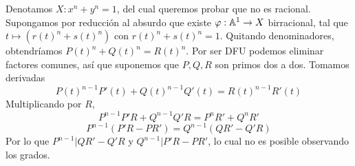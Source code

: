 \documentclass[twoside]{article}
\begin{document}
\begin{ejercicio}{4}
\end{ejercicio}
\begin{solucion}
Denotamos $X: x^n+y^n=1$, del cual queremos probar que no es racional. Supongamos por reducción al absurdo que existe $\varphi:\mathbb{A}^1\to X$ birracional, tal que $t\mapsto (r(t)^n+s(t)^n)$ con $r(t)^n+s(t)^n=1$.  Quitando denominadores, obtendríamos $P(t)^n+Q(t)^n=R(t)^n$. Por ser DFU podemos eliminar factores comunes, así que suponemos que $P,Q,R$ son primos dos a dos. Tomamos derivadas
$$P(t)^{n-1}P'(t)+Q(t)^{n-1}Q'(t)=R(t)^{n-1}R'(t)$$
Multiplicando por $R$, 
$$P^{n-1}P'R+Q^{n-1}Q'R=P^nR'+Q^nR'$$
$$P^{n-1}(P'R-PR')=Q^{n-1}(QR'-Q'R)$$
Por lo que $P^{n-1}|QR'-Q'R$ y $Q^{n-1}|P'R-PR'$, lo cual no es posible observando los grados.
\end{solucion}
\end{document}
